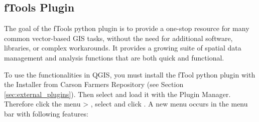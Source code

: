 \subsection{fTools Plugin}\label{sec:ftools}


The goal of the fTools python plugin is to provide a one-stop resource for
many common vector-based GIS tasks, without the need for additional software, 
libraries, or complex workarounds. It provides a growing suite of spatial 
data management and analysis functions that are both quick and functional. 


To use the functionalities in QGIS, you must install the fTool python plugin
with the  Installer from Carson Farmers 
Repository (see Section \ref{sec:external_plugins}). Then select and load it 
with the Plugin Manager. Therefore click the menu  > 
, select  and click 
. A new menu  occurs in the menu bar with 
following features:


